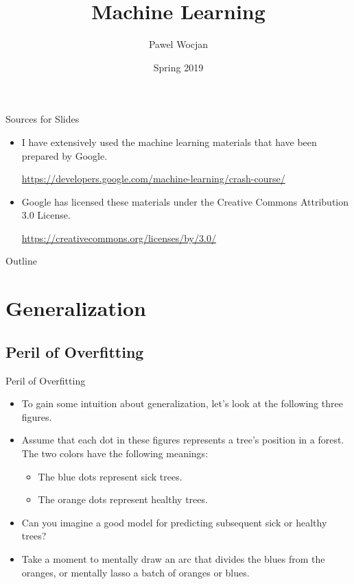\documentclass{beamer}
\title[ML]{Machine Learning}
\author{Pawel Wocjan}
\institute{University of Central Florida}
\date{Spring 2019}
\begin{document}
\begin{frame}
  \titlepage
\end{frame}

\begin{frame}{Sources for Slides}

\begin{itemize}
\item I have extensively used the machine learning materials that have been prepared by Google. 

\medskip
\footnotesize{ 
\url{https://developers.google.com/machine-learning/crash-course/}
}

\item Google has licensed these materials under the Creative Commons Attribution 3.0 License.

\medskip
\footnotesize{ 
\url{https://creativecommons.org/licenses/by/3.0/}
}
\end{itemize}
\end{frame}

\begin{frame}{Outline}
  \tableofcontents
\end{frame}

\section{Generalization}

\subsection{Peril of Overfitting}

\begin{frame}{Peril of Overfitting}
\begin{itemize}
    \item To gain some intuition about generalization, let's look at the following three figures. 
    \item Assume that each dot in these figures represents a tree's position in a forest. The two colors have the following meanings:
    \begin{itemize}
        \item The blue dots represent sick trees.
        \item The orange dots represent healthy trees.
    \end{itemize}
    \item Can you imagine a good model for predicting subsequent sick or healthy trees? 
    \item Take a moment to mentally draw an arc that divides the blues from the oranges, or mentally lasso a batch of oranges or blues. 
\end{itemize}
\end{frame}
\end{document}
